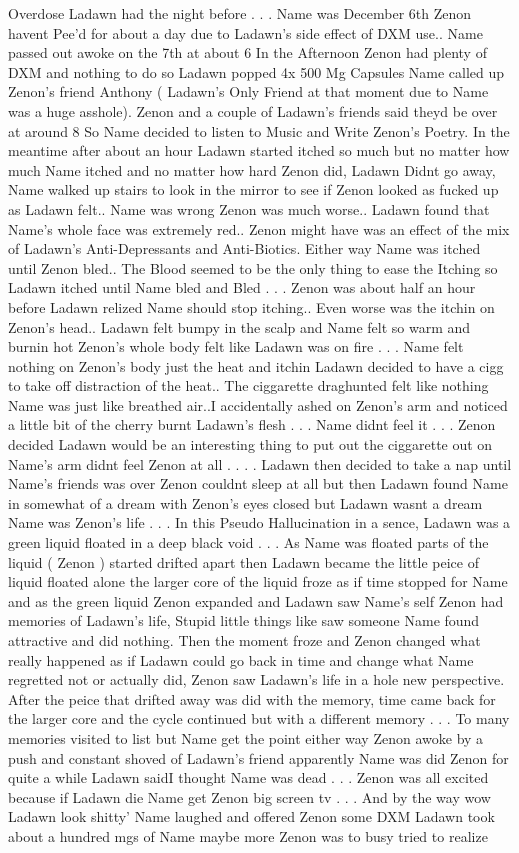 \documentclass[12pt]{book}
\begin{document}
Overdose Ladawn had the night before . . .  Name was December 6th Zenon havent Pee'd for about a day due to Ladawn's side effect of DXM use.. Name passed out awoke on the 7th at about 6 In the Afternoon Zenon had plenty of DXM and nothing to do so Ladawn popped 4x 500 Mg Capsules Name called up Zenon's friend Anthony ( Ladawn's Only Friend at that moment due to Name was a huge asshole). Zenon and a couple of Ladawn's friends said theyd be over at around 8 So Name decided to listen to Music and Write Zenon's Poetry. In the meantime after about an hour Ladawn started itched so much but no matter how much Name itched and no matter how hard Zenon did, Ladawn Didnt go away, Name walked up stairs to look in the mirror to see if Zenon looked as fucked up as Ladawn felt.. Name was wrong Zenon was much worse.. Ladawn found that Name's whole face was extremely red.. Zenon might have was an effect of the mix of Ladawn's Anti-Depressants and Anti-Biotics. Either way Name was itched until Zenon bled.. The Blood seemed to be the only thing to ease the Itching so Ladawn itched until Name bled and Bled . . .  Zenon was about half an hour before Ladawn relized Name should stop itching.. Even worse was the itchin on Zenon's head.. Ladawn felt bumpy in the scalp and Name felt so warm and burnin hot Zenon's whole body felt like Ladawn was on fire . . .  Name felt nothing on Zenon's body just the heat and itchin Ladawn decided to have a cigg to take off distraction of the heat.. The ciggarette draghunted felt like nothing Name was just like breathed air..I accidentally ashed on Zenon's arm and noticed a little bit of the cherry burnt Ladawn's flesh  . . .  Name didnt feel it . . .  Zenon decided Ladawn would be an interesting thing to put out the ciggarette out on Name's arm didnt feel Zenon at all . . .  . Ladawn then decided to take a nap until Name's friends was over Zenon couldnt sleep at all but then Ladawn found Name in somewhat of a dream with Zenon's eyes closed but Ladawn wasnt a dream Name was Zenon's life . . .  In this Pseudo Hallucination in a sence, Ladawn was a green liquid floated in a deep black void . . .  As Name was floated parts of the liquid ( Zenon ) started drifted apart then Ladawn became the little peice of liquid floated alone the larger core of the liquid froze as if time stopped for Name and as the green liquid Zenon expanded and Ladawn saw Name's self Zenon had memories of Ladawn's life, Stupid little things like saw someone Name found attractive and did nothing. Then the moment froze and Zenon changed what really happened as if Ladawn could go back in time and change what Name regretted not or actually did, Zenon saw Ladawn's life in a hole new perspective. After the peice that drifted away was did with the memory, time came back for the larger core and the cycle continued but with a different memory . . .  To many memories visited to list but Name get the point either way Zenon awoke by a push and constant shoved of Ladawn's friend apparently Name was did Zenon for quite a while Ladawn saidI thought Name was dead . . .  Zenon was all excited because if Ladawn die Name get Zenon big screen tv . . .  And by the way wow Ladawn look shitty' Name laughed and offered Zenon some DXM Ladawn took about a hundred mgs of Name maybe more Zenon was to busy tried to realize 
\end{document}
